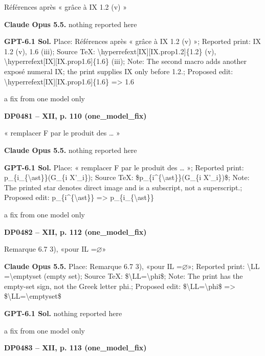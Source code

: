 Références après « grâce à IX 1.2 (v) »\par
\textbf{Claude Opus 5.5.} nothing reported here\par
\textbf{GPT-6.1 Sol.} Place: Références après « grâce à IX 1.2 (v) »; Reported print: IX 1.2 (v), 1.6 (iii); Source TeX: \textbackslash{}hyperrefext[IX][IX.prop1.2]\{1.2\} (v), \textbackslash{}hyperrefext[IX][IX.prop1.6]\{1.6\} (iii); Note: The second macro adds another exposé numeral IX; the print supplies IX only before 1.2.; Proposed edit: \textbackslash{}hyperrefext[IX][IX.prop1.6]\{1.6\} =\allowbreak > 1.6\par
a fix from one model only\par
\par\noindent\hypertarget{DP0481}{}\textbf{DP0481 -- XII, p. 110 (one\_model\_fix)}\par
« remplacer F par le produit des … »\par
\textbf{Claude Opus 5.5.} nothing reported here\par
\textbf{GPT-6.1 Sol.} Place: « remplacer F par le produit des … »; Reported print: p\_\{i\_\{\textbackslash{}ast\}\}(G\_\{i X'\_i\}); Source TeX: \$p\_\{i\textasciicircum{}\{\textbackslash{}ast\}\}(G\_\{i X'\_i\})\$; Note: The printed star denotes direct image and is a subscript, not a superscript.; Proposed edit: p\_\{i\textasciicircum{}\{\textbackslash{}ast\}\} =\allowbreak > p\_\{i\_\{\textbackslash{}ast\}\}\par
a fix from one model only\par
\par\noindent\hypertarget{DP0482}{}\textbf{DP0482 -- XII, p. 112 (one\_model\_fix)}\par
Remarque 6.7 3), «pour IL =\allowbreak  \ensuremath{\varnothing}»\par
\textbf{Claude Opus 5.5.} Place: Remarque 6.7 3), «pour IL =\allowbreak  \ensuremath{\varnothing}»; Reported print: \textbackslash{}LL =\allowbreak  \textbackslash{}emptyset (empty set); Source TeX: \$\textbackslash{}LL=\allowbreak \textbackslash{}phi\$; Note: The print has the empty-set sign, not the Greek letter phi.; Proposed edit: \$\textbackslash{}LL=\allowbreak \textbackslash{}phi\$ =\allowbreak > \$\textbackslash{}LL=\allowbreak \textbackslash{}emptyset\$\par
\textbf{GPT-6.1 Sol.} nothing reported here\par
a fix from one model only\par
\par\noindent\hypertarget{DP0483}{}\textbf{DP0483 -- XII, p. 113 (one\_model\_fix)}\par
